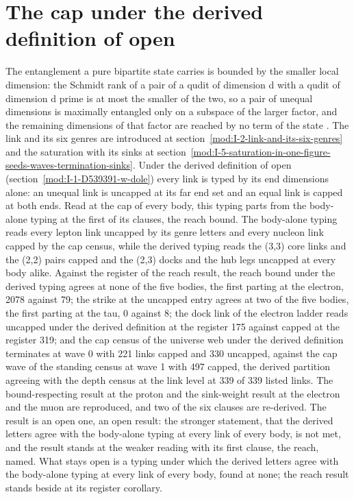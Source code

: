 \section{The cap under the derived definition of open}\label{mod:I-2-D539697-w-aptc}
The entanglement a pure bipartite state carries is bounded by the smaller local dimension: the Schmidt rank of a pair of a qudit of dimension d with a qudit of dimension d prime is at most the smaller of the two, so a pair of unequal dimensions is maximally entangled only on a subspace of the larger factor, and the remaining dimensions of that factor are reached by no term of the state \cite{Nielsen2000,Horodecki2009}. The link and its six genres are introduced at section~\ref{mod:I-2-link-and-its-six-genres} and the saturation with its sinks at section~\ref{mod:I-5-saturation-in-one-figure-seeds-waves-termination-sinks}.
Under the derived definition of open (section~\ref{mod:I-1-D539391-w-dole}) every link is typed by its end dimensions alone: an unequal link is uncapped at its far end set and an equal link is capped at both ends. Read at the cap of every body, this typing parts from the body-alone typing at the first of its clauses, the reach bound.
The body-alone typing reads every lepton link uncapped by its genre letters and every nucleon link capped by the cap census, while the derived typing reads the (3,3) core links and the (2,2) pairs capped and the (2,3) docks and the hub legs uncapped at every body alike. Against the register of the reach result, the reach bound under the derived typing agrees at none of the five bodies, the first parting at the electron, 2078 against 79; the strike at the uncapped entry agrees at two of the five bodies, the first parting at the tau, 0 against 8; the dock link of the electron ladder reads uncapped under the derived definition at the register 175 against capped at the register 319; and the cap census of the universe web under the derived definition terminates at wave 0 with 221 links capped and 330 uncapped, against the cap wave of the standing census at wave 1 with 497 capped, the derived partition agreeing with the depth census at the link level at 339 of 339 listed links. The bound-respecting result at the proton and the sink-weight result at the electron and the muon are reproduced, and two of the six clauses are re-derived.
The result is an open one, an open result: the stronger statement, that the derived letters agree with the body-alone typing at every link of every body, is not met, and the result stands at the weaker reading with its first clause, the reach, named.
What stays open is a typing under which the derived letters agree with the body-alone typing at every link of every body, found at none; the reach result stands beside at its register corollary.
